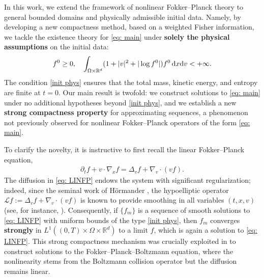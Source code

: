 \documentclass[10pt, reqno]{amsart}
\theoremstyle{plain}
\theoremstyle{definition}
\theoremstyle{remark}
\numberwithin{equation}{section}
\newcommand{\calL}{\mathcal L}
\newcommand{\p}{\partial}
\newcommand{\R}{\mathbb{R}}
\newcommand{\dx}{\textnormal{d}x}
\newcommand{\dv}{\textnormal{d}v}
\begin{document}
 In this work, we extend the framework of nonlinear Fokker--Planck theory to general bounded domains and physically admissible initial data. Namely, by developing a new compactness method, based on a weighted Fisher information, we tackle the existence theory for \eqref{eq: main} under \textbf{solely the physical assumptions} on the initial data:
\begin{align} \label{init phys}
        f^0\ge 0, \quad \int_{\Omega\times\R^d} (1+|v|^2+|\log f^0|) f^0 \,\dx\dv < +\infty.    
\end{align}
The condition \eqref{init phys} ensures that the total mass, kinetic energy, and entropy are finite at $t=0$. Our main result is twofold: we construct solutions to \eqref{eq: main} under no additional hypotheses beyond \eqref{init phys}, and we establish a new \textbf{strong compactness property} for approximating sequences, a phenomenon not previously observed for nonlinear Fokker--Planck operators of the form \eqref{eq: main}.


To clarify the novelty, it is instructive to first recall the linear Fokker--Planck equation,
\begin{align}\label{eq: LINFP}
    \p_t f + v\cdot \nabla_x f  = \Delta_v f + \nabla_v\cdot (vf).
\end{align}
The diffusion in \eqref{eq: LINFP} endows the system with significant regularization; indeed, since the seminal work of H\"ormander \cite{H67}, the hypoelliptic operator $\calL f := \Delta_v f + \nabla_v\cdot (vf)$ is known to provide smoothing in all variables $(t,x,v)$ (see, for instance, \cite{HN04, LL08}). Consequently, if $\{f_m\}$ is a sequence of smooth solutions to \eqref{eq: LINFP} with uniform bounds of the type \eqref{init phys}, then ${f_m}$ converges \textbf{strongly} in $L^1((0,T)\times\Omega\times\R^d)$ to a limit $f$, which is again a solution to \eqref{eq: LINFP}. This strong compactness mechanism was crucially exploited in \cite{DL88FKB} to construct solutions to the Fokker--Planck--Boltzmann equation, where the nonlinearity stems from the Boltzmann collision operator but the diffusion remains linear.
\end{document}

